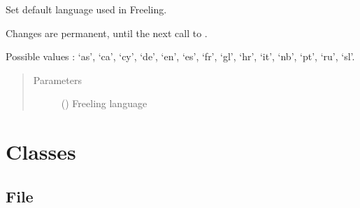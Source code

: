 \documentclass[letterpaper,10pt,english]{sphinxmanual}
\begin{document}
\begin{fulllineitems}
\label{\detokenize{configuration:loacore.conf.set_lang}}
Set default language used in Freeling.

Changes are permanent, until the next call to {\hyperref[\detokenize{configuration:loacore.conf.set_lang}]{}}.

Possible values : ‘as’, ‘ca’, ‘cy’, ‘de’, ‘en’, ‘es’, ‘fr’, ‘gl’, ‘hr’, ‘it’, ‘nb’, ‘pt’, ‘ru’, ‘sl’.
\begin{quote}\begin{description}
\item[{Parameters}] \leavevmode
{} () \textendash{} Freeling language

\end{description}\end{quote}

\end{fulllineitems}



\chapter{Classes}
\label{\detokenize{classes:classes}}\label{\detokenize{classes::doc}}

\section{File}
\label{\detokenize{classes:file}}
\end{document}
